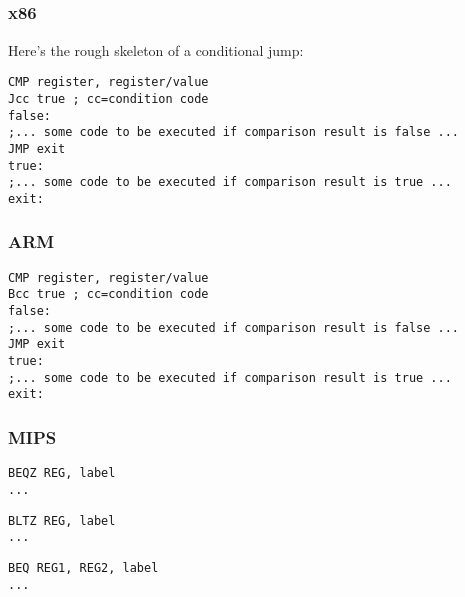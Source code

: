 \label{sec:Jcc}






\subsection{\Conclusion{}}

\subsubsection{x86}

Here's the rough skeleton of a conditional jump:

\begin{lstlisting}[caption=x86,style=customasmx86]
CMP register, register/value
Jcc true ; cc=condition code
false:
;... some code to be executed if comparison result is false ...
JMP exit 
true:
;... some code to be executed if comparison result is true ...
exit:
\end{lstlisting}

\subsubsection{ARM}

\begin{lstlisting}[caption=ARM,style=customasmARM]
CMP register, register/value
Bcc true ; cc=condition code
false:
;... some code to be executed if comparison result is false ...
JMP exit 
true:
;... some code to be executed if comparison result is true ...
exit:
\end{lstlisting}

\subsubsection{MIPS}

\begin{lstlisting}[caption=Check for zero,style=customasmMIPS]
BEQZ REG, label
...
\end{lstlisting}

\begin{lstlisting}[caption=Check for less than zero using pseudoinstruction,style=customasmMIPS]
BLTZ REG, label
...
\end{lstlisting}

\begin{lstlisting}[caption=Check for equal values,style=customasmMIPS]
BEQ REG1, REG2, label
...
\end{lstlisting}

